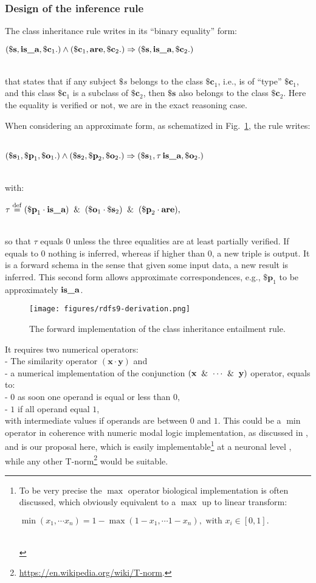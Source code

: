 \documentclass[sn-mathphys]{sn-jnl}
\newcommand{\defq}{\stackrel {\rm def}{=}}
\newcommand{\tab}{\hphantom{~}}
\newcommand{\eqline}[1]{~\vspace{0.1cm}\\\centerline{$#1$}\vspace{0.1cm}\\}
\begin{document}
\subsubsection{Design of the inference rule}

The class inheritance rule writes in its ``binary equality'' form:
\eqline{(\mathbf{\$s} ,  \texttt{\bf is\_a} ,  \mathbf{\$c}_1 .) \wedge (\mathbf{\$c}_1 ,  \texttt{\bf are} ,  \mathbf{\$c}_2 .) \Rightarrow (\mathbf{\$s} ,  \texttt{\bf is\_a} ,  \mathbf{\$c}_2 .)}
that states that if any subject $\$s$ belongs to the class $\mathbf{\$c}_1$, i.e., is of ``type'' $\mathbf{\$c}_1$, and this class $\mathbf{\$c}_1$ is a subclass of $\mathbf{\$c}_2$, then $\mathbf{\$s}$ also belongs to the class $\mathbf{\$c}_2$. Here the equality is verified or not, we are in the exact reasoning case.

When considering an approximate form, as schematized in Fig.~\ref{rdfs9-derivation}, the rule writes:
\eqline{(\mathbf{\$s}_1 ,  \mathbf{\$p}_1 ,  \mathbf{\$o}_1 .) \wedge (\mathbf{\$s}_2 ,  \mathbf{\$p}_2 ,  \mathbf{\$o}_2 .) \Rightarrow (\mathbf{\$s}_1, \tau \, \texttt{\bf is\_a}, \mathbf{\$o}_2 .)}
with:
\eqline{\tau \defq (\mathbf{\$p}_1 \cdot \texttt{\bf is\_a}) \And (\mathbf{\$o}_1 \cdot \mathbf{\$s}_2) \And (\mathbf{\$p}_2 \cdot \texttt{\bf are}),}
so that $\tau$ equals $0$ unless the three equalities are at least partially verified. If equals to $0$ nothing is inferred, whereas if higher than $0$, a new triple is output. It is a forward schema in the sense that given some input data, a new result is inferred. This second form allows approximate correspondences, e.g., $\mathbf{\$p}_1$ to be approximately $\texttt{\bf is\_a}$.

\begin{figure}[ht]
\centerline{\texttt{[image: figures/rdfs9-derivation.png]}}
\caption{The forward implementation of the class inheritance entailment rule.}
\label{rdfs9-derivation}
\end{figure}

It requires two numerical operators:
\\- The similarity operator $(\mathbf{x} \cdot \mathbf{y})$ and
\\ - a numerical implementation of the conjunction $(\mathbf{x} \And \cdots \And \mathbf{y})$ operator, equals to:
\\ \tab \tab - $0$ as soon one operand is equal or less than $0$,
\\ \tab \tab - $1$ if all operand equal $1$,
\\ with intermediate values if operands are between $0$ and $1$.
This could be a $\min$ operator in coherence with numeric modal logic implementation, as discussed in \cite{vieville_representation_2022}, and is our proposal here, which is easily implementable\footnote{To be very precise the $\max$ operator biological implementation is often discussed, which obviously equivalent to a $\max$ up to linear transform:
\eqline{\min(x_1, \cdots x_n) = 1 - \max(1 - x_1, \cdots 1 - x_n), \mbox{ with } x_i \in [0, 1].}} at a neuronal level \cite{bugmann_biologically_1997}, while any other T-norm\footnote{\url{https://en.wikipedia.org/wiki/T-norm}.} would be suitable.
\end{document}
